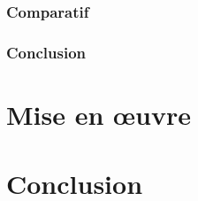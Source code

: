 \documentclass{"../../res/univ-projet-rapport"}
\begin{document}
\subsection{Comparatif}

\subsection{Conclusion}





\chapter{Mise en œuvre}



\chapter{Conclusion}
\cite{HOTPrfc}

{}

\end{document}
